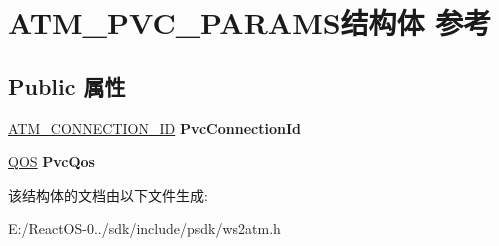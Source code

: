 \hypertarget{struct_a_t_m___p_v_c___p_a_r_a_m_s}{}\section{A\+T\+M\+\_\+\+P\+V\+C\+\_\+\+P\+A\+R\+A\+M\+S结构体 参考}
\label{struct_a_t_m___p_v_c___p_a_r_a_m_s}
\subsection*{Public 属性}
\begin{DoxyCompactItemize}
\item 
\mbox{\label{struct_a_t_m___p_v_c___p_a_r_a_m_s_a85f6c75568f73cbbcb4259fcc9ac7760}} 
\hyperlink{struct_a_t_m___c_o_n_n_e_c_t_i_o_n___i_d}{A\+T\+M\+\_\+\+C\+O\+N\+N\+E\+C\+T\+I\+O\+N\+\_\+\+ID} {\bfseries Pvc\+Connection\+Id}
\item 
\mbox{\label{struct_a_t_m___p_v_c___p_a_r_a_m_s_a1ff7b56e68aa11fa22552226e2b37339}} 
\hyperlink{struct___quality_of_service}{Q\+OS} {\bfseries Pvc\+Qos}
\end{DoxyCompactItemize}


该结构体的文档由以下文件生成\+:\begin{DoxyCompactItemize}
\item 
E\+:/\+React\+O\+S-\/0../sdk/include/psdk/ws2atm.\+h\end{DoxyCompactItemize}
